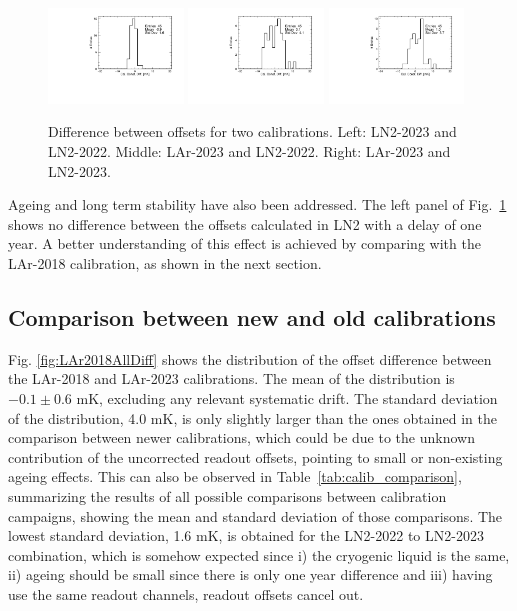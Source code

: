 \begin{figure}[htbp]
\centering
{\includegraphics[width=0.32\textwidth]{images/figure_21_a.pdf}}
{\includegraphics[width=0.32\textwidth]{images/figure_21_b.pdf}}
{\includegraphics[width=0.32\textwidth]{images/figure_21_c.pdf}}
\caption{Difference between offsets for two calibrations. Left: LN2-2023 and LN2-2022. Middle: LAr-2023 and LN2-2022. Right:  LAr-2023 and LN2-2023.}
\label{fig:comp_newCalib}
\end{figure}

Ageing and long term stability have also been addressed. The left panel of Fig.~\ref{fig:comp_newCalib} shows no difference between the offsets calculated in LN2 with a delay of one year. A better understanding of this effect is achieved by comparing with the LAr-2018 calibration, as shown in the next section.

\subsection{Comparison between new and old calibrations}
\label{sec:compNewOld}

\noindent Fig. \ref{fig:LAr2018AllDiff} shows the distribution of the offset difference between the LAr-2018 and LAr-2023 calibrations. The mean of the distribution is $-0.1\pm0.6$ mK, excluding any relevant systematic drift. The standard deviation of the distribution, 4.0 mK, is only slightly larger than the ones obtained in the comparison between newer calibrations, which could be due to the unknown contribution of the uncorrected readout offsets, pointing to small or non-existing ageing effects. This can also be observed in Table~\ref{tab:calib_comparison}, summarizing the results of all possible comparisons between calibration campaigns, showing the mean and standard deviation of those comparisons. The lowest standard deviation, 1.6 mK, is obtained for the LN2-2022 to LN2-2023 combination, which is somehow expected since i) the cryogenic liquid is the same, ii) ageing should be small since there is only one year difference and iii) having use the same readout channels, readout offsets cancel out.

